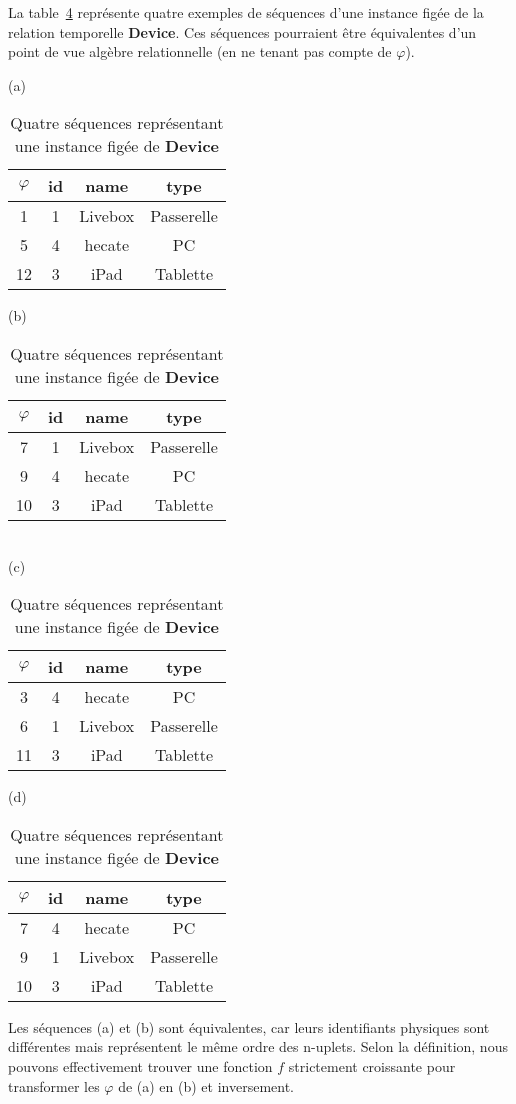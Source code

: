 \begin{example}
La table~\ref{tab:contrib:astral:exequivalence} représente quatre exemples de séquences d'une instance figée de la relation temporelle \textbf{Device}. Ces séquences pourraient être équivalentes d'un point de vue algèbre relationnelle (en ne tenant pas compte de $\varphi$).

\begin{table}[ht]
\centering
(a)
\begin{tabular}{c|ccc} 
      $\varphi$ & id & name & type \\ \hline 
       1  & 1 & Livebox & Passerelle \\
       5  & 4 & hecate & PC\\
       12 & 3 & iPad & Tablette\\
\end{tabular}
\hspace{1cm}
(b)
\begin{tabular}{c|ccc} 
      $\varphi$ & id & name & type \\ \hline 
       7  & 1 & Livebox & Passerelle \\
       9  & 4 & hecate & PC\\
       10 & 3 & iPad & Tablette\\
\end{tabular}\\
(c)
\begin{tabular}{c|ccc} 
      $\varphi$ & id & name & type \\ \hline 
       3  & 4 & hecate & PC\\
       6  & 1 & Livebox & Passerelle \\
       11 & 3 & iPad & Tablette\\
\end{tabular}
\hspace{1cm}
(d)
\begin{tabular}{c|ccc} 
      $\varphi$ & id & name & type \\ \hline 
       7  & 4 & hecate & PC\\
       9  & 1 & Livebox & Passerelle \\
       10 & 3 & iPad & Tablette\\
\end{tabular}
\caption{Quatre séquences représentant une instance figée de \textbf{Device}}\label{tab:contrib:astral:exequivalence}
\end{table}

Les séquences (a) et (b) sont équivalentes, car leurs identifiants physiques sont différentes mais représentent le même ordre des n-uplets. Selon la définition, nous pouvons effectivement trouver une fonction $f$ strictement croissante pour transformer les $\varphi$ de (a) en (b) et inversement. 


\end{example}
